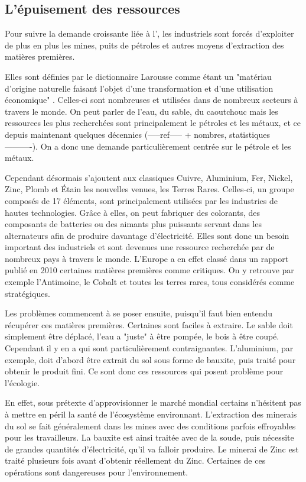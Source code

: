 \subsection{L’épuisement des ressources}

Pour suivre la demande croissante liée à l'\op, les industriels sont forcés d'exploiter de plus en plus les mines, puits de pétroles et autres moyens d'extraction des matières premières.

\medbreak Elles sont définies par le dictionnaire Larousse comme étant un "matériau d'origine naturelle faisant l'objet d'une transformation et d'une utilisation économique" \cite{LarousseMatiere1eres}. Celles-ci sont nombreuses et utilisées dans de nombreux secteurs à travers le monde. On peut parler de l'eau, du sable, du caoutchouc mais les ressources les plus recherchées sont principalement le pétroles et les métaux, et ce depuis maintenant quelques décennies (-----ref----- + nombres, statistiques----------). On a donc une demande particulièrement centrée sur le pétrole et les métaux.

Cependant désormais s'ajoutent aux classiques Cuivre, Aluminium, Fer, Nickel, Zinc, Plomb et Étain les nouvelles venues, les Terres Rares. Celles-ci, un groupe composés de 17 éléments, sont principalement utilisées par les industries de hautes technologies. Grâce à elles, on peut fabriquer des colorants, des composants de batteries ou des aimants plus puissants servant dans les alternateurs afin de produire davantage d’électricité. Elles sont donc un besoin important des industriels et sont devenues une ressource recherchée par de nombreux pays à travers le monde. L'Europe a en effet classé dans un rapport publié en 2010 \cite{RapportEuropeenTerresRares} certaines matières premières comme critiques. On y retrouve par exemple l'Antimoine, le Cobalt et toutes les terres rares, tous considérés comme stratégiques.


\medbreak Les problèmes commencent à se poser ensuite, puisqu'il faut bien entendu récupérer ces matières premières. Certaines sont faciles à extraire. Le sable doit simplement être déplacé, l'eau a "juste" à être pompée, le bois à être coupé. Cependant il y en a qui sont particulièrement contraignantes. L'aluminium, par exemple, doit d'abord être extrait du sol sous forme de bauxite, puis traité pour obtenir le produit fini. Ce sont donc ces ressources qui posent problème pour l'écologie.

En effet, sous prétexte d'approvisionner le marché mondial certains n'hésitent pas à mettre en péril la santé de l'écosystème environnant. L'extraction des minerais du sol se fait généralement dans les mines avec des conditions parfois effroyables pour les travailleurs. La bauxite est ainsi traitée avec de la soude, puis nécessite de grandes quantités d’électricité, qu'il va falloir produire. Le minerai de Zinc est traité plusieurs fois avant d'obtenir réellement du Zinc. Certaines de ces opérations sont dangereuses pour l'environnement.

